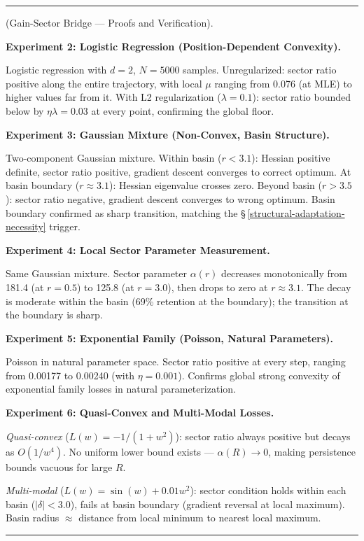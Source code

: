 \documentclass[11pt,oneside]{article}
\newcounter{claim}[section]
\renewcommand{\theclaim}{\thesection.\arabic{claim}}
\newenvironment{segment}[2]{%
  \refstepcounter{claim}%
  \bigskip\noindent\hrule\smallskip
  \noindent{\bfseries #1~\theclaim}\enskip(#2).\par\smallskip
  \noindent\ignorespaces
}{%
  \par\smallskip\noindent\hrule\bigskip
}
\newenvironment{derivation}[1][]{\begin{segment}{Derivation}{#1}}{\end{segment}}
\begin{document}
\begin{derivation}[Gain-Sector Bridge — Proofs and Verification]
\medskip\noindent\textbf{Experiment 2: Logistic Regression (Position-Dependent Convexity).}


Logistic regression with $d = 2$, $N = 5000$ samples. Unregularized: sector ratio positive along the entire trajectory, with local $\mu$ ranging from 0.076 (at MLE) to higher values far from it. With L2 regularization ($\lambda = 0.1$): sector ratio bounded below by $\eta\lambda = 0.03$ at every point, confirming the global floor.


\medskip\noindent\textbf{Experiment 3: Gaussian Mixture (Non-Convex, Basin Structure).}


Two-component Gaussian mixture. Within basin ($r < 3.1$): Hessian positive definite, sector ratio positive, gradient descent converges to correct optimum. At basin boundary ($r \approx 3.1$): Hessian eigenvalue crosses zero. Beyond basin ($r > 3.5$): sector ratio negative, gradient descent converges to wrong optimum. Basin boundary confirmed as sharp transition, matching the \S\,\ref{structural-adaptation-necessity} trigger.


\medskip\noindent\textbf{Experiment 4: Local Sector Parameter Measurement.}


Same Gaussian mixture. Sector parameter $\alpha(r)$ decreases monotonically from 181.4 (at $r = 0.5$) to 125.8 (at $r = 3.0$), then drops to zero at $r \approx 3.1$. The decay is moderate within the basin (69\% retention at the boundary); the transition at the boundary is sharp.


\medskip\noindent\textbf{Experiment 5: Exponential Family (Poisson, Natural Parameters).}


Poisson in natural parameter space. Sector ratio positive at every step, ranging from 0.00177 to 0.00240 (with $\eta = 0.001$). Confirms global strong convexity of exponential family losses in natural parameterization.


\medskip\noindent\textbf{Experiment 6: Quasi-Convex and Multi-Modal Losses.}


\textit{Quasi-convex} ($L(w) = -1/(1+w^2)$): sector ratio always positive but decays as $O(1/w^4)$. No uniform lower bound exists — $\alpha(R) \to 0$, making persistence bounds vacuous for large $R$.

\textit{Multi-modal} ($L(w) = \sin(w) + 0.01w^2$): sector condition holds within each basin ($\lvert\delta\rvert < 3.0$), fails at basin boundary (gradient reversal at local maximum). Basin radius $\approx$ distance from local minimum to nearest local maximum.




\end{derivation}
\end{document}
